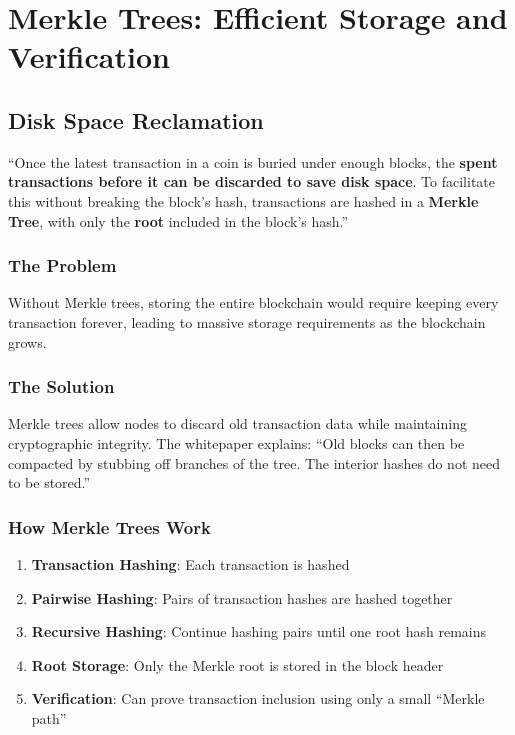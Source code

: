 
\section{Merkle Trees: Efficient Storage and Verification}
\label{sec:merkle-trees}

\subsection{Disk Space Reclamation}
\label{subsec:disk-reclamation}

``Once the latest transaction in a coin is buried under enough blocks, the \textbf{spent transactions before it can be discarded to save disk space}. To facilitate this without breaking the block's hash, transactions are hashed in a \textbf{Merkle Tree}, with only the \textbf{root} included in the block's hash.''

\subsubsection{The Problem}

Without Merkle trees, storing the entire blockchain would require keeping every transaction forever, leading to massive storage requirements as the blockchain grows.

\subsubsection{The Solution}

Merkle trees allow nodes to discard old transaction data while maintaining cryptographic integrity. The whitepaper explains: ``Old blocks can then be compacted by stubbing off branches of the tree. The interior hashes do not need to be stored.''

\subsubsection{How Merkle Trees Work}

\begin{enumerate}
  \item \textbf{Transaction Hashing}: Each transaction is hashed
  \item \textbf{Pairwise Hashing}: Pairs of transaction hashes are hashed together
  \item \textbf{Recursive Hashing}: Continue hashing pairs until one root hash remains
  \item \textbf{Root Storage}: Only the Merkle root is stored in the block header
  \item \textbf{Verification}: Can prove transaction inclusion using only a small ``Merkle path''
\end{enumerate}

